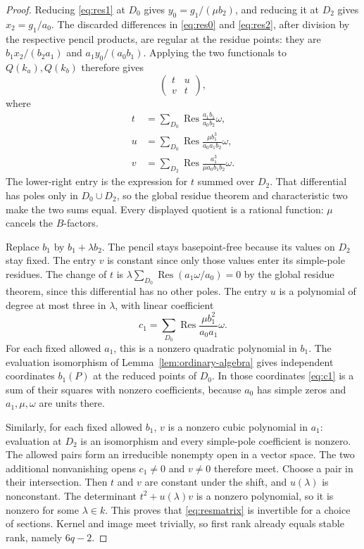 \documentclass[11pt]{article}
\theoremstyle{definition}\newtheorem{definition}[theorem]{Definition}
\theoremstyle{remark}\newtheorem{remark}[theorem]{Remark}
\begin{document}
\begin{proof}
Reducing \eqref{eq:res1} at $D_0$ gives $y_0=g_1/(\mu b_2)$, and reducing it at $D_2$ gives $x_2=g_1/a_0$. The discarded differences in \eqref{eq:res0} and \eqref{eq:res2}, after division by the respective pencil products, are regular at the residue points: they are $b_1x_2/(b_2a_1)$ and $a_1y_0/(a_0b_1)$. Applying the two functionals to $Q(k_a),Q(k_b)$ therefore gives
\begin{equation}\label{eq:resmatrix}
 \begin{pmatrix}t&u\\v&t\end{pmatrix},
\end{equation}
where
\begin{align*}
 t&=\sum_{D_0}\operatorname{Res}\frac{a_1b_1}{a_0b_2}\omega,\\
 u&=\sum_{D_0}\operatorname{Res}\frac{\mu b_1^3}{a_0a_1b_2}\omega,\\
 v&=\sum_{D_2}\operatorname{Res}\frac{a_1^3}{\mu a_0b_1b_2}\omega.
\end{align*}
The lower-right entry is the expression for $t$ summed over $D_2$. That differential has poles only in $D_0\cup D_2$, so the global residue theorem and characteristic two make the two sums equal. Every displayed quotient is a rational function: $\mu$ cancels the $B$-factors.

Replace $b_1$ by $b_1+\lambda b_2$. The pencil stays basepoint-free because its values on $D_2$ stay fixed. The entry $v$ is constant since only those values enter its simple-pole residues. The change of $t$ is
$\lambda\sum_{D_0}\operatorname{Res}(a_1\omega/a_0)=0$ by the global residue theorem, since this differential has no other poles. The entry $u$ is a polynomial of degree at most three in $\lambda$, with linear coefficient
\begin{equation}\label{eq:c1}
 c_1=\sum_{D_0}\operatorname{Res}\frac{\mu b_1^2}{a_0a_1}\omega.
\end{equation}
For each fixed allowed $a_1$, this is a nonzero quadratic polynomial in $b_1$. The evaluation isomorphism of Lemma~\ref{lem:ordinary-algebra} gives independent coordinates $b_1(P)$ at the reduced points of $D_0$. In those coordinates \eqref{eq:c1} is a sum of their squares with nonzero coefficients, because $a_0$ has simple zeros and $a_1,\mu,\omega$ are units there.

Similarly, for each fixed allowed $b_1$, $v$ is a nonzero cubic polynomial in $a_1$: evaluation at $D_2$ is an isomorphism and every simple-pole coefficient is nonzero. The allowed pairs form an irreducible nonempty open in a vector space. The two additional nonvanishing opens $c_1\ne0$ and $v\ne0$ therefore meet. Choose a pair in their intersection. Then $t$ and $v$ are constant under the shift, and $u(\lambda)$ is nonconstant. The determinant $t^2+u(\lambda)v$ is a nonzero polynomial, so it is nonzero for some $\lambda\in k$. This proves that \eqref{eq:resmatrix} is invertible for a choice of sections. Kernel and image meet trivially, so first rank already equals stable rank, namely $6q-2$.
\end{proof}
\end{document}
